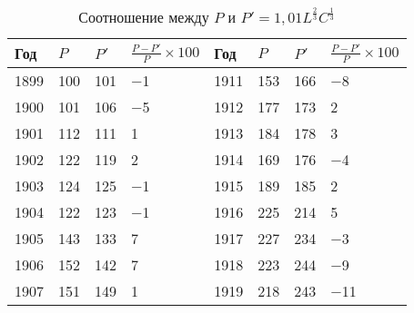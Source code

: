\documentclass[leqno]{article}  %
\begin{document}
\begin{table}
\centering
\footnotesize{
\caption{Соотношение между \(P\) и \(P'=1,01L^{\frac23}C^{\frac13}\)}%
\label{tab8}%
\begin{tabular}{p{}|p{}|p{}|p{}||p{}|p{}|p{}|p{}}
\hline
Год & \(P\) & \(P'\) & \(\frac{P-P'}{P} \times 100\) & Год & \(P\) & \(P'\) & \(\frac{P-P'}{P} \times 100\) \\
\hline
1899 & \hfill 100 & \hfill 101 & \hfill \(-\)1 \hspace*{4mm} & 1911 & \hfill 153 & \hfill 166 & \hfill \(-\)8 \hspace*{4mm} \\
1900 & \hfill 101 & \hfill 106 & \hfill \(-\)5 \hspace*{4mm} & 1912 & \hfill 177 & \hfill 173 & \hfill 2 \hspace*{4mm} \\
1901 & \hfill 112 & \hfill 111 & \hfill 1 \hspace*{4mm} & 1913 & \hfill 184 & \hfill 178 & \hfill 3 \hspace*{4mm} \\
1902 & \hfill 122 & \hfill 119 & \hfill 2 \hspace*{4mm} & 1914 & \hfill 169 & \hfill 176 & \hfill \(-\)4 \hspace*{4mm} \\
1903 & \hfill 124 & \hfill 125 & \hfill \(-\)1 \hspace*{4mm} & 1915 & \hfill 189 & \hfill 185 & \hfill 2 \hspace*{4mm} \\
1904 & \hfill 122 & \hfill 123 & \hfill \(-\)1 \hspace*{4mm} & 1916 & \hfill 225 & \hfill 214 & \hfill 5 \hspace*{4mm} \\
1905 & \hfill 143 & \hfill 133 & \hfill 7 \hspace*{4mm} & 1917 & \hfill 227 & \hfill 234 & \hfill \(-\)3 \hspace*{4mm} \\
1906 & \hfill 152 & \hfill 142 & \hfill 7 \hspace*{4mm} & 1918 & \hfill 223 & \hfill 244 & \hfill \(-\)9 \hspace*{4mm} \\
1907 & \hfill 151 & \hfill 149 & \hfill 1 \hspace*{4mm} & 1919 & \hfill 218 & \hfill 243 & \hfill \(-\)11 \hspace*{4mm} \\

\end{tabular}}
\end{table}
\end{document}
